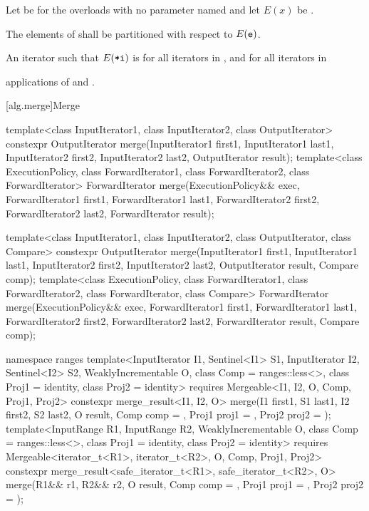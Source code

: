 \begin{itemdescr}
\pnum
Let  be  for the overloads
with no parameter named 
and let $E(x)$ be .

\pnum
\requires
The elements  of 
shall be partitioned with respect to $E(\texttt{e})$.

\pnum
\returns
An iterator  such that
$E(\texttt{*i})$ is  for all iterators 
in , and
 for all iterators  in 

\pnum
\complexity {} applications of 
and .
\end{itemdescr}

[alg.merge]{Merge}

%
\begin{itemdecl}
template<class InputIterator1, class InputIterator2,
         class OutputIterator>
  constexpr OutputIterator
    merge(InputIterator1 first1, InputIterator1 last1,
          InputIterator2 first2, InputIterator2 last2,
          OutputIterator result);
template<class ExecutionPolicy, class ForwardIterator1, class ForwardIterator2,
         class ForwardIterator>
  ForwardIterator
    merge(ExecutionPolicy&& exec,
          ForwardIterator1 first1, ForwardIterator1 last1,
          ForwardIterator2 first2, ForwardIterator2 last2,
          ForwardIterator result);

template<class InputIterator1, class InputIterator2,
         class OutputIterator, class Compare>
  constexpr OutputIterator
    merge(InputIterator1 first1, InputIterator1 last1,
          InputIterator2 first2, InputIterator2 last2,
          OutputIterator result, Compare comp);
template<class ExecutionPolicy, class ForwardIterator1, class ForwardIterator2,
         class ForwardIterator, class Compare>
  ForwardIterator
    merge(ExecutionPolicy&& exec,
          ForwardIterator1 first1, ForwardIterator1 last1,
          ForwardIterator2 first2, ForwardIterator2 last2,
          ForwardIterator result, Compare comp);

namespace ranges {
  template<InputIterator I1, Sentinel<I1> S1, InputIterator I2, Sentinel<I2> S2,
      WeaklyIncrementable O, class Comp = ranges::less<>, class Proj1 = identity,
      class Proj2 = identity>
    requires Mergeable<I1, I2, O, Comp, Proj1, Proj2>
    constexpr merge_result<I1, I2, O>
      merge(I1 first1, S1 last1, I2 first2, S2 last2, O result,
            Comp comp = {}, Proj1 proj1 = {}, Proj2 proj2 = {});
  template<InputRange R1, InputRange R2, WeaklyIncrementable O, class Comp = ranges::less<>,
      class Proj1 = identity, class Proj2 = identity>
    requires Mergeable<iterator_t<R1>, iterator_t<R2>, O, Comp, Proj1, Proj2>
    constexpr merge_result<safe_iterator_t<R1>, safe_iterator_t<R2>, O>
      merge(R1&& r1, R2&& r2, O result,
            Comp comp = {}, Proj1 proj1 = {}, Proj2 proj2 = {});
}
\end{itemdecl}

